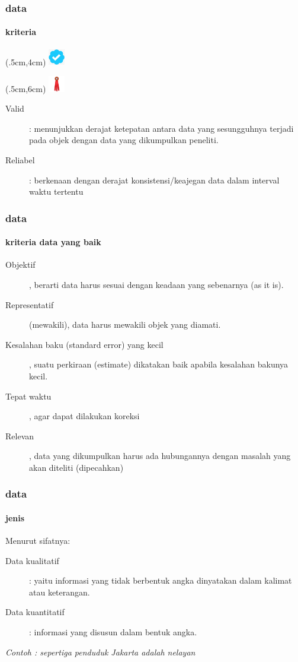 \documentclass[main.tex]{subfiles}
\begin{document}
\begin{frame}[c]
	\frametitle{data}
	\framesubtitle{kriteria}
	\begin{textblock*}{40mm}(.5cm,4cm) %
		\includegraphics[width=20pt]{figures/ver}
	\end{textblock*}
	\begin{textblock*}{30pt}(.5cm,6cm) %
		\includegraphics[width=20pt]{figures/rel}
	\end{textblock*}

	\begin{description}
		\item[Valid]: menunjukkan derajat ketepatan antara data yang sesungguhnya terjadi pada objek dengan data yang dikumpulkan peneliti.
		\item[Reliabel]: berkenaan dengan derajat konsistensi/keajegan data dalam interval waktu tertentu
	\end{description}

\end{frame}

\begin{frame}[t]
	\frametitle{data}
	\framesubtitle{kriteria data yang baik}
	\begin{description}
		\item [Objektif], berarti data harus sesuai dengan keadaan yang sebenarnya (as it is).
		\item [Representatif] (mewakili), data harus mewakili objek yang diamati.
		\item [Kesalahan baku (standard error) yang kecil], suatu perkiraan (estimate) dikatakan baik apabila kesalahan bakunya kecil.
		\item [Tepat waktu], agar dapat dilakukan koreksi
		\item [Relevan], data yang dikumpulkan harus ada hubungannya dengan masalah yang akan diteliti (dipecahkan)
	\end{description}
\end{frame}

\begin{frame}[c]
	\frametitle{data}
	\framesubtitle{jenis}
	Menurut sifatnya:
	\begin{description}
		\item[Data kualitatif]: yaitu informasi  yang tidak berbentuk angka dinyatakan dalam kalimat  atau keterangan.
		\item [Data kuantitatif]: informasi yang disusun dalam bentuk angka.
	\end{description}
	\textit{Contoh : sepertiga  penduduk Jakarta adalah  nelayan}

\end{frame}
\end{document}
